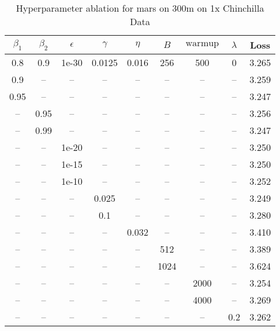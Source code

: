 \begin{table}[h!]
\centering
\caption{Hyperparameter ablation for mars on 300m on 1x Chinchilla Data}
\label{tab:ablation_mars_300m_on_1x_chinchilla_data}
\begin{tabular}{ccccccccc}
\toprule
$\beta_1$ & $\beta_2$ & $\epsilon$ & $\gamma$ & $\eta$ & $B$ & $\mathrm{warmup}$ & $\lambda$ & Loss \\
\midrule
0.8 & 0.9 & 1e-30 & 0.0125 & 0.016 & 256 & 500 & 0 & 3.265 \\
\midrule
0.9 & -- & -- & -- & -- & -- & -- & -- & 3.259 \\
0.95 & -- & -- & -- & -- & -- & -- & -- & 3.247 \\
-- & 0.95 & -- & -- & -- & -- & -- & -- & 3.256 \\
-- & 0.99 & -- & -- & -- & -- & -- & -- & 3.247 \\
-- & -- & 1e-20 & -- & -- & -- & -- & -- & 3.250 \\
-- & -- & 1e-15 & -- & -- & -- & -- & -- & 3.250 \\
-- & -- & 1e-10 & -- & -- & -- & -- & -- & 3.252 \\
-- & -- & -- & 0.025 & -- & -- & -- & -- & 3.249 \\
-- & -- & -- & 0.1 & -- & -- & -- & -- & 3.280 \\
-- & -- & -- & -- & 0.032 & -- & -- & -- & 3.410 \\
-- & -- & -- & -- & -- & 512 & -- & -- & 3.389 \\
-- & -- & -- & -- & -- & 1024 & -- & -- & 3.624 \\
-- & -- & -- & -- & -- & -- & 2000 & -- & 3.254 \\
-- & -- & -- & -- & -- & -- & 4000 & -- & 3.269 \\
-- & -- & -- & -- & -- & -- & -- & 0.2 & 3.262 \\
\bottomrule
\end{tabular}
\end{table}

